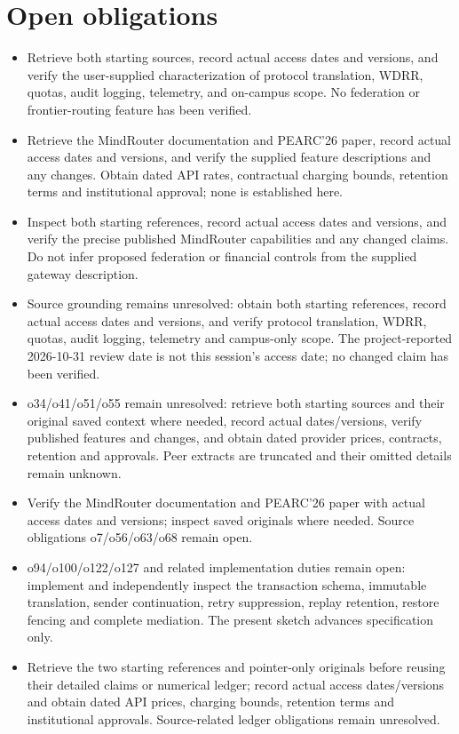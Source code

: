 \documentclass[11pt]{article}
\begin{document}
\section{Open obligations}
\begin{itemize}
\item Retrieve both starting sources, record actual access dates and versions, and verify the user-supplied characterization of protocol translation, WDRR, quotas, audit logging, telemetry, and on-campus scope. No federation or frontier-routing feature has been verified.
\item Retrieve the MindRouter documentation and PEARC'26 paper, record actual access dates and versions, and verify the supplied feature descriptions and any changes. Obtain dated API rates, contractual charging bounds, retention terms and institutional approval; none is established here.
\item Inspect both starting references, record actual access dates and versions, and verify the precise published MindRouter capabilities and any changed claims. Do not infer proposed federation or financial controls from the supplied gateway description.
\item Source grounding remains unresolved: obtain both starting references, record actual access dates and versions, and verify protocol translation, WDRR, quotas, audit logging, telemetry and campus-only scope. The project-reported 2026-10-31 review date is not this session's access date; no changed claim has been verified.
\item o34/o41/o51/o55 remain unresolved: retrieve both starting sources and their original saved context where needed, record actual dates/versions, verify published features and changes, and obtain dated provider prices, contracts, retention and approvals. Peer extracts are truncated and their omitted details remain unknown.
\item Verify the MindRouter documentation and PEARC'26 paper with actual access dates and versions; inspect saved originals where needed. Source obligations o7/o56/o63/o68 remain open.
\item o94/o100/o122/o127 and related implementation duties remain open: implement and independently inspect the transaction schema, immutable translation, sender continuation, retry suppression, replay retention, restore fencing and complete mediation. The present sketch advances specification only.
\item Retrieve the two starting references and pointer-only originals before reusing their detailed claims or numerical ledger; record actual access dates/versions and obtain dated API prices, charging bounds, retention terms and institutional approvals. Source-related ledger obligations remain unresolved.

\end{itemize}
\end{document}
